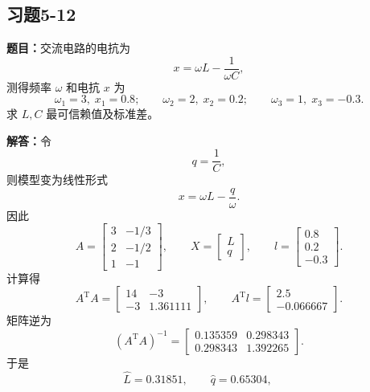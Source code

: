 \documentclass[UTF8,zihao=-4]{ctexart}
\newcommand{\problem}[1]{\subsection*{#1}}
\newcommand{\timu}{\noindent\textbf{题目：}}
\newcommand{\jieda}{\noindent\textbf{解答：}}
\begin{document}
{\newpage

\problem{习题5-12}
\timu 交流电路的电抗为
\begin{equation*}
    x=\omega L-\frac{1}{\omega C},
\end{equation*}
测得频率 $\omega$ 和电抗 $x$ 为
\begin{equation*}
    \omega_1=3,\;x_1=0.8;
    \qquad
    \omega_2=2,\;x_2=0.2;
    \qquad
    \omega_3=1,\;x_3=-0.3.
\end{equation*}
求 $L,C$ 最可信赖值及标准差。

\jieda 令
\begin{equation*}
    q=\frac{1}{C},
\end{equation*}
则模型变为线性形式
\begin{equation*}
    x=\omega L-\frac{q}{\omega}.
\end{equation*}
因此
\begin{equation*}
    A=\begin{bmatrix}
        3&-1/3\\2&-1/2\\1&-1
    \end{bmatrix},
    \qquad
    X=\begin{bmatrix}L\\q\end{bmatrix},
    \qquad
    l=\begin{bmatrix}0.8\\0.2\\-0.3\end{bmatrix}.
\end{equation*}
计算得
\begin{equation*}
    A^{\mathrm T}A=\begin{bmatrix}
        14&-3\\-3&1.361111
    \end{bmatrix},
    \qquad
    A^{\mathrm T}l=\begin{bmatrix}2.5\\-0.066667\end{bmatrix}.
\end{equation*}
矩阵逆为
\begin{equation*}
    (A^{\mathrm T}A)^{-1}=\begin{bmatrix}
        0.135359&0.298343\\
        0.298343&1.392265
    \end{bmatrix}.
\end{equation*}
于是
\begin{equation*}
    \hat{L}=0.31851,
    \qquad
    \hat{q}=0.65304,
    \qquad

\end{equation*}}
\end{document}
